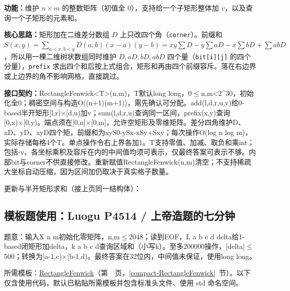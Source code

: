 \noindent\textbf{功能：}\allowbreak 维护 $n\times m$ 的整数矩阵（初值全 0），支持给一个子矩形整体加 $v$，以及查询一个子矩形的元素和。

\textbf{核心思路：}\allowbreak 矩形加在二维差分数组 $D$ 上只改四个角（\texttt{corner}）。前缀和 $S(x,y)=\sum_{a<x,b<y}D(a,b)(x-a)(y-b)=xy\sum D-y\sum aD-x\sum bD+\sum abD$，所以用一棵二维树状数组同时维护 $D,aD,bD,abD$ 四个量（\texttt{bit[i][j]} 的四个分量），\texttt{prefix} 求出四个和后按上式组合，矩形和再由四个前缀容斥。落在右边界或上边界的角不影响网格，直接跳过。



{\sloppy{}\noindent\textbf{接口契约：}RectangleFenwick<T>(n,m)，T默认long long，0$\le$n,m<2\textasciicircum{}30，初始化全0；稠密空间与构造O((n+1)(m+1))，需先确认可分配。add(l,d,r,u,v)给0-based半开矩形[l,r)×[d,u)加v；sum(l,d,r,u)查询同一区间，prefix(x,y)查询[0,x)×[0,y)。端点须在[0,n]×[0,m]，允许空矩形及零维矩阵。差分四角维护D、xD、yD、xyD四个矩，前缀和为xyS0-ySx-xSy+Sxy；每次操作O(log n log m)，实际存储每格4个T。单点操作令右上界各加1。T支持零值、加减、取负和乘int；包括-v、各坐标乘积及容斥在内的中间值均须可表示，仅最终答案可表示不够。内部bit与corner不供直接修改。重新赋值RectangleFenwick(n,m)清空；不支持稀疏大坐标自动压缩，因为区间加仍取决于真实格子数量。\par}

\Needspace{453pt}



\newpage

\noindent 更新与半开矩形求和（接上页同一结构体）：



\Needspace{422pt}

\subsection*{模板题使用：Luogu P4514 / 上帝造题的七分钟}

\label{usage-example-247}

题意：输入X n m初始化零矩阵，n,m$\le$2048；读到EOF，L a b c d delta给1-based闭矩形加delta，k a b c d查询区域和（小写k）。至多200000操作，|delta|$\le$500；转换为[a-1,c)×[b-1,d)。最终答案在32位内，中间值未保证，使用long long。

所需模板：\hyperref[compact-RectangleFenwick]{RectangleFenwick}（第~\pageref{compact-RectangleFenwick}~页，\ref{compact-RectangleFenwick}~节）。以下仅含使用代码，默认已粘贴所需模板并包含标准头文件、使用 std 命名空间。

